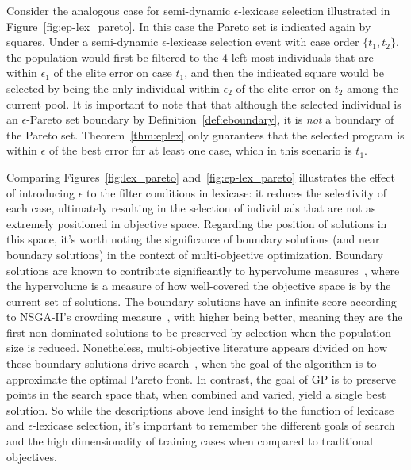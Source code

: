 \documentclass[twoside]{article}
\begin{document}
Consider the analogous case for semi-dynamic $\epsilon$-lexicase selection illustrated in Figure~\ref{fig:ep-lex_pareto}. In this case the Pareto set is indicated again by squares. Under a semi-dynamic $\epsilon$-lexicase selection event with case order $\{t_1, t_2\}$, the population would first be filtered to the 4 left-most individuals that are within $\epsilon_1$ of the elite error on case $t_1$, and then the indicated square would be selected by being the only individual within $\epsilon_2$ of the elite error on $t_2$ among the current pool. It is important to note that that although the selected individual is an $\epsilon$-Pareto set boundary by Definition~\ref{def:eboundary}, it is {\it not} a boundary of the Pareto set. Theorem~\ref{thm:eplex} only guarantees that the selected program is within $\epsilon$ of the best error for at least one case, which in this scenario is $t_1$. 

Comparing Figures~\ref{fig:lex_pareto} and~\ref{fig:ep-lex_pareto} illustrates the effect of introducing $\epsilon$ to the filter conditions in lexicase: it reduces the selectivity of each case, ultimately resulting in the selection of individuals that are not as extremely positioned in objective space. Regarding the position of solutions in this space, it's worth noting the significance of boundary solutions (and near boundary solutions) in the context of multi-objective optimization. Boundary solutions are known to contribute significantly to hypervolume measures~\citep{deb_evaluating_2005}, where the hypervolume is a measure of how well-covered the objective space is by the current set of solutions. The boundary solutions have an infinite score according to NSGA-II's crowding measure~\citep{schoenauer_fast_2000}, with higher being better, meaning they are the first non-dominated solutions to be preserved by selection when the population size is reduced. Nonetheless, multi-objective literature appears divided on how these boundary solutions drive search~\citep{wagner_pareto-_2007}, when the goal of the algorithm is to approximate the optimal Pareto front. In contrast, the goal of GP is to preserve points in the search space that, when combined and varied, yield a single best solution. So while the descriptions above lend insight to the function of lexicase and $\epsilon$-lexicase selection, it's important to remember the different goals of search and the high dimensionality of training cases when compared to traditional objectives.  
\end{document}
